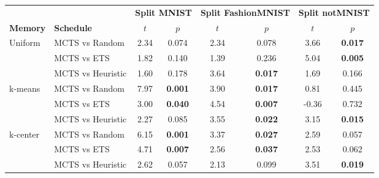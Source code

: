 \begin{tabular}{llcccccc}
\toprule
                          &                   & \multicolumn{2}{c}{\textbf{Split MNIST}} & \multicolumn{2}{c}{\textbf{Split FashionMNIST}} & \multicolumn{2}{c}{\textbf{Split notMNIST}} \\
\cmidrule(lr){3-4} \cmidrule(lr){5-6} \cmidrule(lr){7-8}
\textbf{Memory}                    & \textbf{Schedule} & $t$                 & $p$                    & $t$                    & $p$                        & $t$                   & $p$                     \\ \midrule
\multirow{3}{*}{Uniform}  & MCTS vs Random    & 2.34            & 0.074           & 2.34               & 0.078               & 3.66              & \textbf{0.017}            \\
                          & MCTS vs ETS       & 1.82            & 0.140           & 1.39               & 0.236               & 5.04              & \textbf{0.005}            \\
                          & MCTS vs Heuristic   & 1.60            & 0.178           & 3.64               & \textbf{0.017}               & 1.69              & 0.166            \\ \midrule
\multirow{3}{*}{k-means}  & MCTS vs Random    & 7.97            & \textbf{0.001}           & 3.90               & \textbf{0.017}               & 0.81              & 0.445            \\
                          & MCTS vs ETS       & 3.00            & \textbf{0.040}           & 4.54               & \textbf{0.007}               & -0.36             & 0.732            \\
                          & MCTS vs Heuristic   & 2.27            & 0.085           & 3.55               & \textbf{0.022}               & 3.15              & \textbf{0.015}            \\ \midrule
\multirow{3}{*}{k-center} & MCTS vs Random    & 6.15            & \textbf{0.001}           & 3.37               & \textbf{0.027}               & 2.59              & 0.057            \\
                          & MCTS vs ETS       & 4.71            & \textbf{0.007}           & 2.56               & \textbf{0.037}               & 2.53              & 0.062            \\
                          & MCTS vs Heuristic   & 2.62            & 0.057           & 2.13               & 0.099               & 3.51              & \textbf{0.019}            \\ \midrule

\end{tabular}
